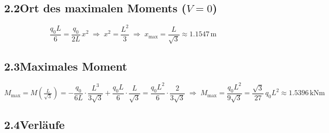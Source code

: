 \documentclass[a4paper,11pt]{article}
\begin{document}
\subsection*{2.2\quad Ort des maximalen Moments ($V = 0$)}

\[
  \frac{q_0 L}{6} = \frac{q_0}{2L}\,x^2
  \;\Rightarrow\; x^2 = \frac{L^2}{3}
  \;\Rightarrow\; \boxed{x_{\max} = \frac{L}{\sqrt{3}} \approx 1.1547\,\text{m}}
\]

\subsection*{2.3\quad Maximales Moment}

\[
  M_{\max} = M\!\left(\tfrac{L}{\sqrt{3}}\right)
  = -\frac{q_0}{6L}\cdot\frac{L^3}{3\sqrt{3}} + \frac{q_0 L}{6}\cdot\frac{L}{\sqrt{3}}
  = \frac{q_0 L^2}{6}\cdot\frac{2}{3\sqrt{3}}
  \;\Rightarrow\;
  \boxed{M_{\max} = \frac{q_0 L^2}{9\sqrt{3}}
         = \frac{\sqrt{3}}{27}\,q_0 L^2 \approx 1.5396\,\text{kNm}}
\]

\subsection*{2.4\quad Verläufe}
\end{document}
